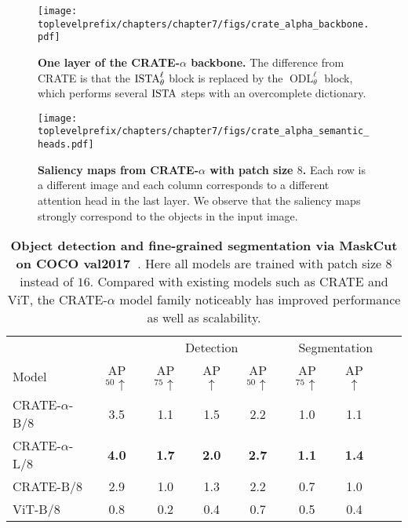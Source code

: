 \documentclass[../../book-main.tex]{subfiles}
\begin{document}
\begin{figure}
    \centering 
    \texttt{[image: \\toplevelprefix/chapters/chapter7/figs/crate\_alpha\_backbone.pdf]}
    \caption{\small\textbf{One layer of the CRATE-\(\alpha\) backbone.} The difference from CRATE is that the \(\operatorname{ISTA}_{\theta}^{\ell}\) block is replaced by the \(\operatorname{ODL}_{\theta}^{\ell}\) block, which performs several \(\operatorname{ISTA}\) steps with an overcomplete dictionary.}
    \label{fig:crate_alpha_backbone}
\end{figure}

\begin{figure}
    \centering 
    \texttt{[image: \\toplevelprefix/chapters/chapter7/figs/crate\_alpha\_semantic\_heads.pdf]}
    \caption{\small\textbf{Saliency maps from CRATE-\(\alpha\) with patch size \(8\).} Each row is a different image and each column corresponds to a different attention head in the last layer. We observe that the saliency maps strongly correspond to the objects in the input image.}
    \label{fig:crate_alpha_saliency_maps}
\end{figure}

\begin{table}
    \centering
    \begin{tabular}{@{}lcccccccc@{}}
    \toprule
     &  & \multicolumn{3}{c}{Detection} &  \multicolumn{3}{c}{Segmentation} \\ 
    Model & AP$_{50} \uparrow $ & AP$_{75} \uparrow $ & AP $\uparrow$ & AP$_{50} \uparrow$ & AP$_{75} \uparrow $ & AP $\uparrow$ \\ 
    \midrule
    \midrule
    CRATE-\(\alpha\)-B/8 & 3.5 & 1.1 & 1.5 & 2.2 & 1.0 & 1.1 \\
    CRATE-\(\alpha\)-L/8 & \textbf{4.0} & \textbf{1.7} & \textbf{2.0} & \textbf{2.7} & \textbf{1.1} & \textbf{1.4} \\
    \midrule
    \color{gray}CRATE-B/8 & \color{gray}2.9 & \color{gray}1.0 & \color{gray}1.3 & \color{gray}2.2 & \color{gray}0.7 & \color{gray}1.0 \\
    \color{gray}ViT-B/8 & \color{gray}0.8 & \color{gray}0.2 & \color{gray}0.4 & \color{gray}0.7 & \color{gray}0.5 & \color{gray}0.4 \\
    \bottomrule
    \end{tabular}
    \caption{\small \textbf{Object detection and fine-grained segmentation via MaskCut on COCO val2017~\citep{lin2014microsoft}}. Here all models are trained with patch size \(8\) instead of \(16\). Compared with existing models such as CRATE and ViT, the CRATE-\(\alpha\) model family noticeably has improved performance as well as scalability.}
    \label{tab:crate_alpha_detection_segmentation}
\end{table}
\end{document}
